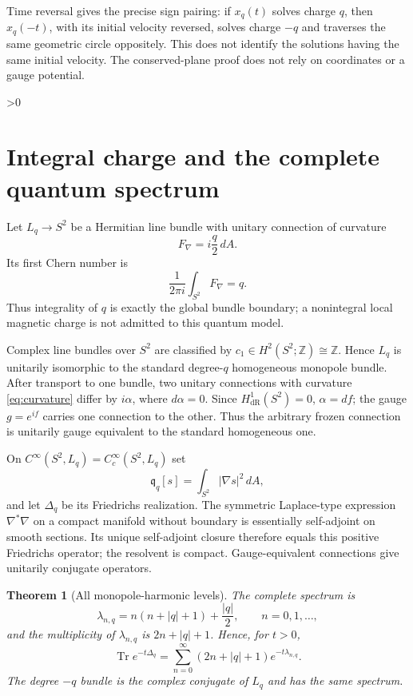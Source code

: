 \documentclass[10pt]{article}
\providecommand{\CRevisionRound}{2}
\newtheorem{theorem}{Theorem}
\begin{document}
Time reversal gives the precise sign pairing: if $x_q(t)$ solves charge $q$,
then $x_q(-t)$, with its initial velocity reversed, solves charge $-q$ and
traverses the same geometric circle oppositely.  This does not identify the
solutions having the same initial velocity.  The conserved-plane proof does
not rely on coordinates or a gauge potential.

\ifnum\CRevisionRound>0
\section{Integral charge and the complete quantum spectrum}
Let $L_q\to S^2$ be a Hermitian line bundle with unitary connection of
curvature
\begin{equation}\label{eq:curvature}
 F_\nabla=i\frac q2\,dA.
\end{equation}
Its first Chern number is
\[
 \frac{1}{2\pi i}\int_{S^2}F_\nabla=q.
\]
Thus integrality of $q$ is exactly the global bundle boundary; a
nonintegral local magnetic charge is not admitted to this quantum model.

Complex line bundles over $S^2$ are classified by
$c_1\in H^2(S^2;\mathbb Z)\cong\mathbb Z$.  Hence $L_q$ is unitarily
isomorphic to the standard degree-$q$ homogeneous monopole bundle.  After
transport to one bundle, two unitary connections with curvature
\eqref{eq:curvature} differ by $i\alpha$, where $d\alpha=0$.  Since
$H^1_{\mathrm{dR}}(S^2)=0$, $\alpha=df$; the gauge $g=e^{if}$ carries one
connection to the other.  Thus the arbitrary frozen connection is
unitarily gauge equivalent to the standard homogeneous one.

On $C^\infty(S^2,L_q)=C_c^\infty(S^2,L_q)$ set
\[
 \mathfrak q_q[s]=\int_{S^2}|\nabla s|^2\,dA,
\]
and let $\Delta_q$ be its Friedrichs realization.  The symmetric
Laplace-type expression $\nabla^*\nabla$ on a compact manifold without
boundary is essentially self-adjoint on smooth sections.  Its unique
self-adjoint closure therefore equals this positive Friedrichs operator;
the resolvent is compact.  Gauge-equivalent connections give unitarily
conjugate operators.
\begin{theorem}[All monopole-harmonic levels]\label{thm:spectrum}
The complete spectrum is
\begin{equation}\label{eq:spectrum}
 \lambda_{n,q}=n(n+|q|+1)+\frac{|q|}{2},\qquad n=0,1,\ldots,
\end{equation}
and the multiplicity of $\lambda_{n,q}$ is $2n+|q|+1$.  Hence, for $t>0$,
\begin{equation}\label{eq:heat}
 \operatorname{Tr}e^{-t\Delta_q}
 =\sum_{n=0}^{\infty}(2n+|q|+1)e^{-t\lambda_{n,q}}.
\end{equation}
The degree $-q$ bundle is the complex conjugate of $L_q$ and has the same
spectrum.
\end{theorem}
\end{document}
